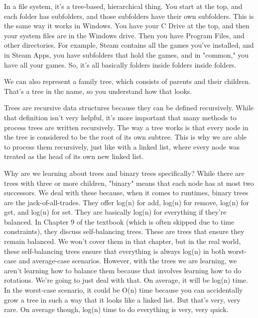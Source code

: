 In a file system, it's a tree-based, hierarchical thing. You start at the top, and each folder has subfolders, and those subfolders have their own subfolders. This is the same way it works in Windows. You have your C Drive at the top, and then your system files are in the Windows drive. Then you have Program Files, and other directories. For example, Steam contains all the games you've installed, and in Steam Apps, you have subfolders that hold the games, and in "common," you have all your games. So, it's all basically folders inside folders inside folders.

We can also represent a family tree, which consists of parents and their children. That's a tree in the name, so you understand how that looks.

Trees are recursive data structures because they can be defined recursively. While that definition isn't very helpful, it's more important that many methods to process trees are written recursively. The way a tree works is that every node in the tree is considered to be the root of its own subtree. This is why we are able to process them recursively, just like with a linked list, where every node was treated as the head of its own new linked list.

Why are we learning about trees and binary trees specifically? While there are trees with three or more children, "binary" means that each node has at most two successors. We deal with these because, when it comes to runtimes, binary trees are the jack-of-all-trades. They offer log(n) for add, log(n) for remove, log(n) for get, and log(n) for set. They are basically log(n) for everything if they're balanced. In Chapter 9 of the textbook (which is often skipped due to time constraints), they discuss self-balancing trees. These are trees that ensure they remain balanced. We won't cover them in that chapter, but in the real world, these self-balancing trees ensure that everything is always log(n) in both worst-case and average-case scenarios. However, with the trees we are learning, we aren't learning how to balance them because that involves learning how to do rotations. We're going to just deal with that. On average, it will be log(n) time. In the worst-case scenario, it could be O(n) time because you can accidentally grow a tree in such a way that it looks like a linked list. But that's very, very rare. On average though, log(n) time to do everything is very, very quick.



